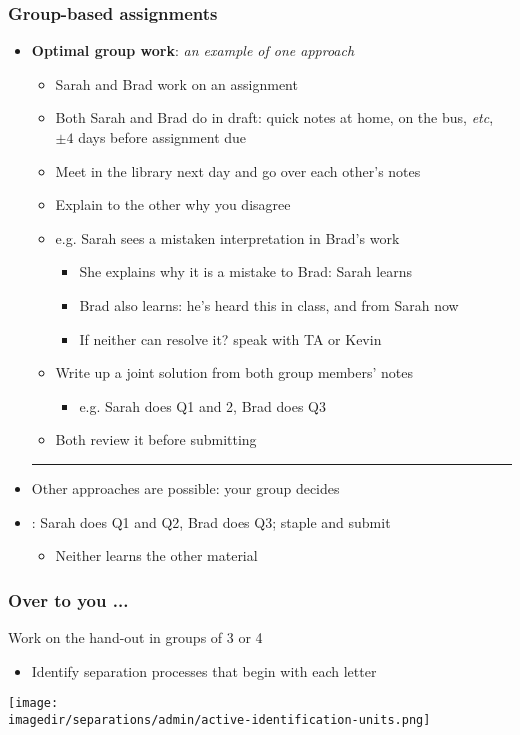 \begin{frame}\frametitle{Group-based assignments}
	\begin{itemize}
		\item	\textbf{Optimal group work}: \emph{an example of one approach}
			\begin{itemize}
				\item	Sarah and Brad work on an assignment
				\item	Both Sarah and Brad do {} in draft: quick notes at home, on the bus, \emph{etc}, $\pm 4$ days before assignment due
				\pause
				\item	Meet in the library next day and go over each other's notes
				\item	Explain to the other why you disagree
				\item	e.g. Sarah sees a mistaken interpretation in Brad's work
				\begin{itemize}
					\item	She explains why it is a mistake to Brad: Sarah learns
					\item	Brad also learns: he's heard this in class, and from Sarah now
					\item	If neither can resolve it? speak with TA or Kevin					
				\end{itemize}
				\pause
				\item	Write up a joint solution from both group members' notes
				\begin{itemize}
					\item	e.g. Sarah does Q1 and 2, Brad does Q3
				\end{itemize}
				\item	Both review it before submitting
			\end{itemize}
		\vspace{2pt}\hrule\vspace{2pt}
		\pause		
		\item	Other approaches are possible: your group decides
		\item	{\color{myOrange}{What doesn't work}:} Sarah does Q1 and Q2, Brad does Q3; staple and submit
		\begin{itemize}
			\item	Neither learns the other material
		\end{itemize}
	\end{itemize}
\end{frame}

\begin{frame}\frametitle{Over to you ...}
	Work on the hand-out in groups of 3 or 4
	\begin{itemize}
		\item	Identify separation processes that begin with each letter
	\end{itemize}
	\begin{center}
		\texttt{[image: \\imagedir/separations/admin/active-identification-units.png]}
	\end{center}
\end{frame}

